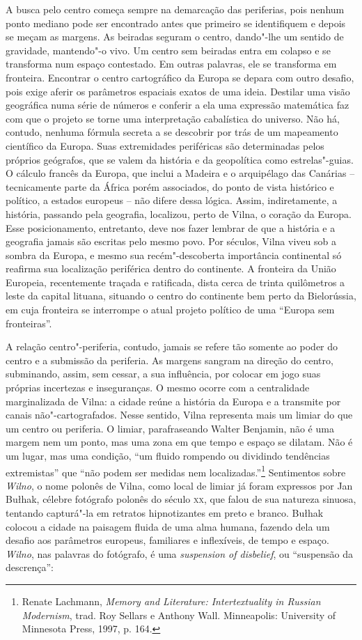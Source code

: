 A busca pelo centro começa sempre na demarcação das periferias, pois
nenhum ponto mediano pode ser encontrado antes que primeiro se
identifiquem e depois se meçam as margens. As beiradas seguram o centro,
dando"-lhe um sentido de gravidade, mantendo"-o vivo. Um centro sem
beiradas entra em colapso e se transforma num espaço contestado. Em
outras palavras, ele se transforma em fronteira. Encontrar o centro
cartográfico da Europa se depara com outro desafio, pois exige aferir os
parâmetros espaciais exatos de uma ideia. Destilar uma visão geográfica
numa série de números e conferir a ela uma expressão matemática faz com
que o projeto se torne uma interpretação cabalística do universo. Não
há, contudo, nenhuma fórmula secreta a se descobrir por trás de um
mapeamento científico da Europa. Suas extremidades periféricas são
determinadas pelos próprios geógrafos, que se valem da história e da
geopolítica como estrelas"-guias. O cálculo francês da Europa, que inclui
a Madeira e o arquipélago das Canárias -- tecnicamente parte da África
porém associados, do ponto de vista histórico e político, a estados
europeus -- não difere dessa lógica. Assim, indiretamente, a história,
passando pela geografia, localizou, perto de Vilna, o coração da Europa.
Esse posicionamento, entretanto, deve nos fazer lembrar de que a
história e a geografia jamais são escritas pelo mesmo povo. Por séculos,
Vilna viveu sob a sombra da Europa, e mesmo sua recém"-descoberta
importância continental só reafirma sua localização periférica dentro do
continente. A fronteira da União Europeia, recentemente traçada e
ratificada, dista cerca de trinta quilômetros a leste da capital
lituana, situando o centro do continente bem perto da Bielorússia, em
cuja fronteira se interrompe o atual projeto político de uma ``Europa
sem fronteiras''.

A relação centro"-periferia, contudo, jamais se refere tão somente ao
poder do centro e a submissão da periferia. As margens sangram na
direção do centro, subminando, assim, sem cessar, a sua influência, por
colocar em jogo suas próprias incertezas e inseguranças. O mesmo ocorre
com a centralidade marginalizada de Vilna: a cidade reúne a história da
Europa e a transmite por canais não"-cartografados. Nesse sentido, Vilna
representa mais um limiar do que um centro ou periferia. O limiar,
parafraseando Walter Benjamin, não é uma margem nem um ponto, mas uma
zona em que tempo e espaço se dilatam. Não é um lugar, mas uma condição,
``um fluido rompendo ou dividindo tendências extremistas'' que ``não
podem ser medidas nem localizadas.''\footnote{Renate Lachmann, \textit{Memory and Literature: Intertextuality in Russian Modernism}, trad. Roy Sellars e Anthony Wall. Minneapolis: University of Minnesota Press, 1997, p. 164.} Sentimentos sobre \textit{Wilno}, o nome polonês de Vilna, como local de limiar já foram expressos por Jan Bułhak,
célebre fotógrafo polonês do século \textsc{xx}, que falou de sua natureza
sinuosa, tentando capturá"-la em retratos hipnotizantes em preto e
branco. Bułhak colocou a cidade na paisagem fluida de uma alma humana,
fazendo dela um desafio aos parâmetros europeus, familiares e
inflexíveis, de tempo e espaço. \textit{Wilno}, nas palavras do fotógrafo, é uma
\textit{suspension of disbelief}, ou ``suspensão da descrença'':

